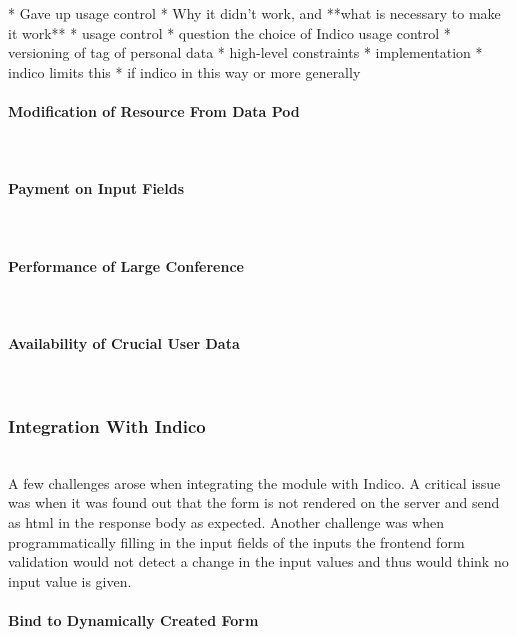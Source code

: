 * Gave up usage control
  * Why it didn't work, and **what is necessary to make it work**
    * usage control
    * question the choice of Indico usage control
    * versioning of tag of personal data
* high-level constraints
* implementation
  * indico limits this
* if indico in this way or more generally

\paragraph{Modification of Resource From Data Pod}\mbox{}\\

\paragraph{Payment on Input Fields}\mbox{}\\

\paragraph{Performance of Large Conference}\mbox{}\\

\paragraph{Availability of Crucial User Data}\mbox{}\\

\subsubsection{Integration With Indico}\mbox{}\\

A few challenges arose when integrating the module with Indico. A critical issue was when it was found out that the form is not rendered on the server and send as \gls{html} in the response body as expected. Another challenge was when programmatically filling in the input fields of the inputs the frontend form validation would not detect a change in the input values and thus would think no input value is given.

\vspace{0.5cm}
\paragraph{Bind to Dynamically Created Form}\mbox{}\\

